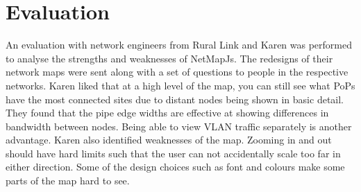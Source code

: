 \documentclass[11pt, a4paper]{article}
\begin{document}


\newpage


\section{Evaluation}
\label{sec:evaluation}

An evaluation with network engineers from Rural Link and Karen was performed to
analyse the strengths and weaknesses of NetMapJs. The redesigns of their network
maps were sent along with a set of questions to people in the respective
networks. Karen liked that at a high level of the map, you can still see what
PoPs have the most connected sites due to distant nodes being shown in basic
detail. They found that the pipe edge widths are effective at showing
differences in bandwidth between nodes. Being able to view VLAN traffic
separately is another advantage.  Karen also identified weaknesses of the map.
Zooming in and out should have hard limits such that the user can not
accidentally scale too far in either direction. Some of the design choices such
as font and colours make some parts of the map hard to see. 
\end{document}
